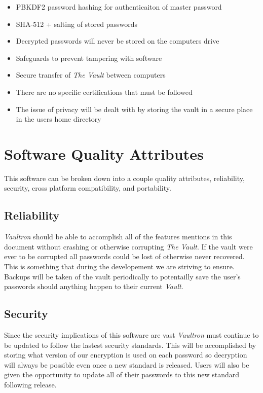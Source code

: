 \documentclass[11pt]{report}
\begin{document}
\begin{itemize}
    \item PBKDF2 password hashing for authenticaiton of master password
    \item SHA-512 + salting of stored passwords
    \item Decrypted passwords will never be stored on the computers drive
    \item Safeguards to prevent tampering with software
    \item Secure transfer of \textit{The Vault} between computers
    \item There are no specific certifications that must be followed
    \item The issue of privacy will be dealt with by storing the vault in a secure place in the users home directory
\end{itemize}


\section{Software Quality Attributes}
This software can be broken down into a couple quality attributes,
reliability, security, cross platform compatibility, and portability.

\subsection{Reliability}
\textit{Vaultron} should be able to accomplish all of the features
mentions in this document without crashing or otherwise corrupting
\textit{The Vault}. If the vault were ever to be corrupted all
passwords could be lost of otherwise never recovered. This is something
that during the developement we are striving to ensure. Backups will
be taken of the vault periodically to potentailly save the user's
passwords should anything happen to their current \textit{Vault}.

\subsection{Security}
Since the security implications of this software are vast
\textit{Vaultron} must continue to be updated to follow the lastest
security standards. This will be accomplished by storing what version
of our encryption is used on each password so decryption will always
be possible even once a new standard is released. Users will also
be given the opportunity to update all of their passwords to this
new standard following release.
\end{document}
